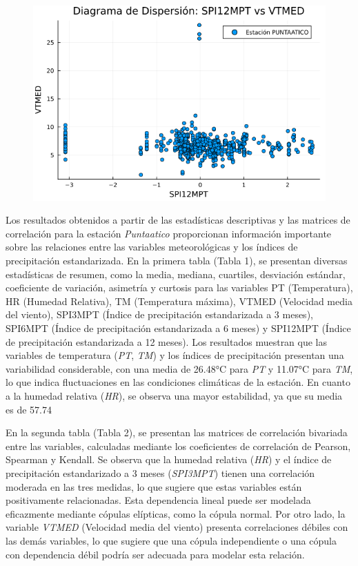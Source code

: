 \begin{figure}[htbp]
\begin{minipage}{0.32\textwidth}
    \includegraphics[width=\linewidth]{Capitulos/Scaterplot/PUNTAATICO_SPI12MPT_vs_VTMED.png}
\end{minipage}

\end{figure}


Los resultados obtenidos a partir de las estadísticas descriptivas y las matrices de correlación para la estación \textit{Puntaatico} proporcionan información importante sobre las relaciones entre las variables meteorológicas y los índices de precipitación estandarizada. En la primera tabla (Tabla 1), se presentan diversas estadísticas de resumen, como la media, mediana, cuartiles, desviación estándar, coeficiente de variación, asimetría y curtosis para las variables PT (Temperatura), HR (Humedad Relativa), TM (Temperatura máxima), VTMED (Velocidad media del viento), SPI3MPT (Índice de precipitación estandarizada a 3 meses), SPI6MPT (Índice de precipitación estandarizada a 6 meses) y SPI12MPT (Índice de precipitación estandarizada a 12 meses). Los resultados muestran que las variables de temperatura (\textit{PT}, \textit{TM}) y los índices de precipitación presentan una variabilidad considerable, con una media de 26.48°C para \textit{PT} y 11.07°C para \textit{TM}, lo que indica fluctuaciones en las condiciones climáticas de la estación. En cuanto a la humedad relativa (\textit{HR}), se observa una mayor estabilidad, ya que su media es de 57.74%

En la segunda tabla (Tabla 2), se presentan las matrices de correlación bivariada entre las variables, calculadas mediante los coeficientes de correlación de Pearson, Spearman y Kendall. Se observa que la humedad relativa (\textit{HR}) y el índice de precipitación estandarizado a 3 meses (\textit{SPI3MPT}) tienen una correlación moderada en las tres medidas, lo que sugiere que estas variables están positivamente relacionadas. Esta dependencia lineal puede ser modelada eficazmente mediante cópulas elípticas, como la cópula normal. Por otro lado, la variable \textit{VTMED} (Velocidad media del viento) presenta correlaciones débiles con las demás variables, lo que sugiere que una cópula independiente o una cópula con dependencia débil podría ser adecuada para modelar esta relación.

